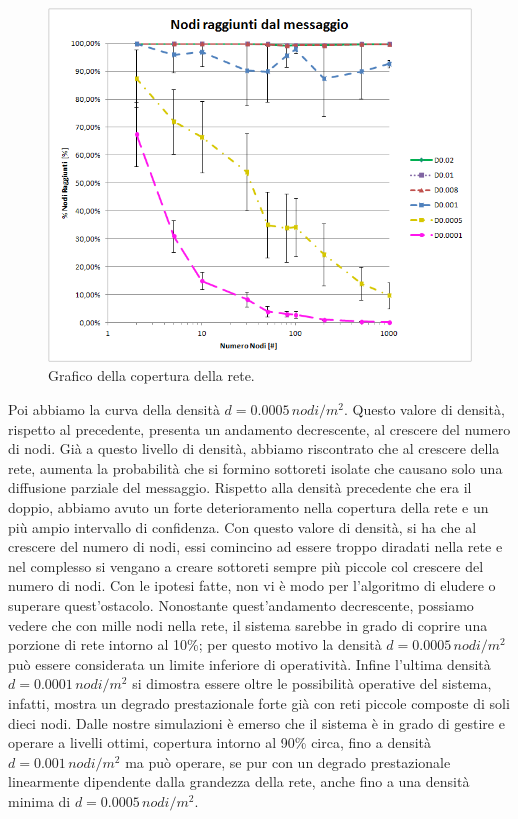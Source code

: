 \begin{figure}[t]
	\centering
	\includegraphics[width=0.9\linewidth]{Images/risultati/copertura}
	\caption[Copertura]{Grafico della copertura della rete.}
	\label{fig:copertura}
\end{figure}

Poi abbiamo la curva della densità $d=0.0005\, nodi/m^2$. Questo valore di densità, rispetto al precedente, presenta un andamento decrescente, al crescere del numero di nodi. Già a questo livello di densità, abbiamo riscontrato che al crescere della rete, aumenta la probabilità che si formino sottoreti isolate che causano solo una diffusione parziale del messaggio. Rispetto alla densità precedente che era il doppio, abbiamo avuto un forte deterioramento nella copertura della rete e un più ampio intervallo di confidenza. Con questo valore di densità, si ha che al crescere del numero di nodi, essi comincino ad essere troppo diradati nella rete e nel complesso si vengano a creare sottoreti sempre più piccole col crescere del numero di nodi. Con le ipotesi fatte, non vi è modo per l'algoritmo di eludere o superare quest'ostacolo. Nonostante quest'andamento decrescente, possiamo vedere che con mille nodi nella rete, il sistema sarebbe in grado di coprire una porzione di rete intorno al 10\%; per questo motivo la densità $d=0.0005\, nodi/m^2$ può essere considerata un limite inferiore di operatività. Infine l'ultima densità $d=0.0001\, nodi/m^2$ si dimostra essere oltre le possibilità operative del sistema, infatti, mostra un degrado prestazionale forte già con reti piccole composte di soli dieci nodi.
Dalle nostre simulazioni è emerso che il sistema è in grado di gestire e operare a livelli ottimi, copertura intorno al 90\% circa, fino a densità $d=0.001\, nodi/m^2$ ma può operare, se pur con un degrado prestazionale linearmente dipendente dalla grandezza della rete, anche fino a una densità minima di $d=0.0005\, nodi/m^2$.

